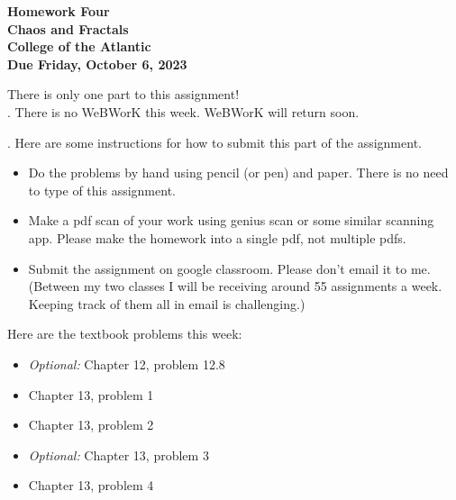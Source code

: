 \documentclass[12pt]{article}
\begin{document}
\pagestyle{empty}
 
\begin{center}
{\LARGE {\bf Homework Four}}\\
\bigskip
{\Large {\bf Chaos and Fractals}}\\
\bigskip
{\Large {\bf College of the Atlantic}}\\
\bigskip
{ {\bf Due Friday, October 6, 2023}}\\  
\end{center}
\medskip

\noindent There is only one part to this assignment!\\

. There is no WeBWorK this
week. WeBWorK will return soon. 

.  Here are some
instructions for how to submit this part of the assignment. \\
\begin{itemize}
\item Do the problems by hand using pencil (or pen) and paper.
  There is no need to type of this assignment.
\item Make a pdf scan of your work using genius scan or some
  similar scanning app.  Please make the homework into a single
  pdf, not multiple pdfs.
\item Submit the assignment on google classroom.  Please don't
  email it to me.  (Between my two classes I will be receiving
  around 55 assignments a week.  Keeping track of them all in email
  is challenging.)
\end{itemize}

\noindent Here are the textbook problems this week:

\begin{itemize}
\setlength{\itemsep}{-1mm}
\item \emph{Optional:} Chapter 12, problem 12.8
\item Chapter 13, problem 1
\item Chapter 13, problem 2
\item \emph{Optional:}  Chapter 13, problem 3
\item Chapter 13, problem 4
\end{itemize}
\end{document}

